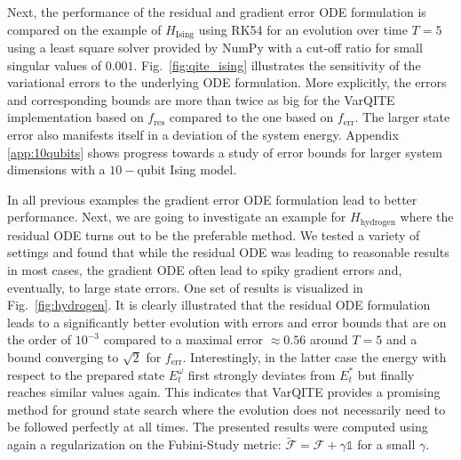 \documentclass[twocolumn, aps, pra, superscriptaddress]{revtex4-1}
\begin{document}
Next, the performance of the residual and gradient error ODE formulation is compared on the example of $H_{\text{Ising}}$ using RK54 for an evolution over time $T=5$ using a least square solver provided by NumPy \cite{Numpy2020} with a cut-off ratio for small singular values of $0.001$. Fig.~\ref{fig:qite_ising} illustrates the sensitivity of the variational errors to the underlying ODE formulation. More explicitly, the errors and corresponding bounds are more than twice as big for the VarQITE implementation based on $f_{\text{res}}$ compared to the one based on $f_{\text{err}}$. The larger state error also manifests itself in a deviation of the system energy.
Appendix \ref{app:10qubits} shows progress towards a study of error bounds for larger system dimensions with a $10-$qubit Ising model.

In all previous examples the gradient error ODE formulation lead to better performance. Next, we are going to investigate an example for $H_{\text{hydrogen}}$ where the residual ODE turns out to be the preferable method.
We tested a variety of settings and found that while the residual ODE was leading to reasonable results in most cases, the gradient ODE often lead to spiky gradient errors and, eventually, to large state errors.
One set of results is visualized in Fig.~\ref{fig:hydrogen}. It is clearly illustrated that the residual ODE formulation leads to a significantly better evolution with errors and error bounds that are on the order of $10^{-3}$ compared to a maximal error $\approx 0.56$ around $T=5$ and a bound converging to $\sqrt{2}$ for $f_{\text{err}}$.
Interestingly, in the latter case the energy with respect to the prepared state $E_t^{\omega}$ first strongly deviates from $E_t^*$ but finally reaches similar values again. This indicates that VarQITE provides a promising method for ground state search where the evolution does not necessarily need to be followed perfectly at all times.
The presented results were computed using again a regularization on the Fubini-Study metric: $\mathcal{\tilde F} = \mathcal{F} + \gamma\mathds{1}$ for a small $\gamma$.
\end{document}
